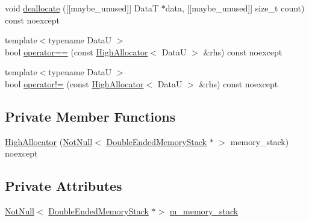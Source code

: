 \begin{DoxyCompactItemize}
\item 
void \mbox{\hyperlink{classmage_1_1_double_ended_memory_stack_1_1_high_allocator_a83581ea8c009f8fa5b623be7ffeb6c53}{deallocate}} (\mbox{[}\mbox{[}maybe\+\_\+unused\mbox{]}\mbox{]} DataT $\ast$data, \mbox{[}\mbox{[}maybe\+\_\+unused\mbox{]}\mbox{]} size\+\_\+t count) const noexcept
\item 
{\footnotesize template$<$typename DataU $>$ }\\bool \mbox{\hyperlink{classmage_1_1_double_ended_memory_stack_1_1_high_allocator_a452887cb961e5a0f6919d0497c0e2617}{operator==}} (const \mbox{\hyperlink{classmage_1_1_double_ended_memory_stack_1_1_high_allocator}{High\+Allocator}}$<$ DataU $>$ \&rhs) const noexcept
\item 
{\footnotesize template$<$typename DataU $>$ }\\bool \mbox{\hyperlink{classmage_1_1_double_ended_memory_stack_1_1_high_allocator_a3857539e5308e88fb0454ecab7bbeda8}{operator!=}} (const \mbox{\hyperlink{classmage_1_1_double_ended_memory_stack_1_1_high_allocator}{High\+Allocator}}$<$ DataU $>$ \&rhs) const noexcept
\end{DoxyCompactItemize}
\subsection*{Private Member Functions}
\begin{DoxyCompactItemize}
\item 
\mbox{\hyperlink{classmage_1_1_double_ended_memory_stack_1_1_high_allocator_a6903aacd7e38597edb9145e73f3099be}{High\+Allocator}} (\mbox{\hyperlink{namespacemage_a8769f9d670d6b585ea306cb1062af94b}{Not\+Null}}$<$ \mbox{\hyperlink{classmage_1_1_double_ended_memory_stack}{Double\+Ended\+Memory\+Stack}} $\ast$ $>$ memory\+\_\+stack) noexcept
\end{DoxyCompactItemize}
\subsection*{Private Attributes}
\begin{DoxyCompactItemize}
\item 
\mbox{\hyperlink{namespacemage_a8769f9d670d6b585ea306cb1062af94b}{Not\+Null}}$<$ \mbox{\hyperlink{classmage_1_1_double_ended_memory_stack}{Double\+Ended\+Memory\+Stack}} $\ast$$>$ \mbox{\hyperlink{classmage_1_1_double_ended_memory_stack_1_1_high_allocator_a5210ee9e229a0d91fc159ea3abb5fcbf}{m\+\_\+memory\+\_\+stack}}
\end{DoxyCompactItemize}
